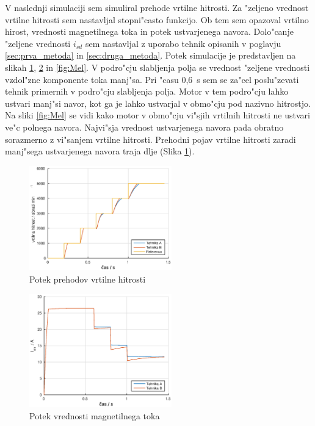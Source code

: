 \documentclass[journal,a4paper,twoside]{sty/IEEEtran}
\begin{document}
V naslednji simulaciji sem simuliral prehode vrtilne hitrosti. Za "zeljeno vrednost vrtilne hitrosti sem nastavljal stopni"casto funkcijo. Ob tem sem opazoval vrtilno hirost, vrednosti magnetilnega toka in potek ustvarjenega navora. Dolo"canje "zeljene vrednosti $i_{sd}$ sem nastavljal z uporabo tehnik opisanih v poglavju \ref{sec:prva_metoda} in \ref{sec:druga_metoda}.
Potek simulacije je predstavljen na slikah \ref{fig:vrtilna}, \ref{fig:imr} in \ref{fig:Mel}. V podro"cju slabljenja polja se vrednost "zeljene vrednosti vzdol"zne komponente toka manj"sa.
Pri "casu 0,6~s  sem se za"cel poslu"zevati tehnik primernih v podro"cju slabljenja polja. Motor v tem podro"cju lahko ustvari manj"si navor, kot ga je lahko ustvarjal v obmo"cju pod nazivno hitrostjo. Na sliki \ref{fig:Mel} se vidi kako motor v obmo"cju vi"sjih vrtilnih hitrosti ne ustvari ve"c polnega navora. Najvi"sja vrednost ustvarjenega navora pada obratno sorazmerno z vi"sanjem vrtilne hitrosti. Prehodni pojav vrtilne hitrosti zaradi manj"sega ustvarjenega navora traja dlje (Slika \ref{fig:vrtilna}).

\begin{figure}
\includegraphics[width=0.55\textwidth]{fig_vrtilna.eps}
\caption{Potek prehodov vrtilne hitrosti}
\label{fig:vrtilna}
\end{figure}

\begin{figure}
\includegraphics[width=0.55\textwidth]{fig_imr.eps}
\caption{Potek vrednosti magnetilnega toka}
\label{fig:imr}
\end{figure}
\end{document}

